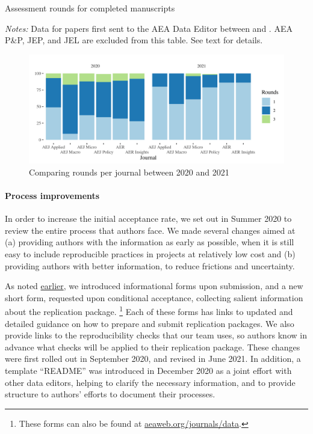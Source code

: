\documentclass[PP]{AEA}
\begin{document}
\begin{table}
    \centering
    \caption{Assessment rounds for completed manuscripts}
    \label{tab:pre:rounds}
    \begin{threeparttable}
    \centering
    
    \begin{tablenotes}
    \item[] \textit{Notes:} Data for papers first sent to the AEA Data Editor between \firstday{} and \lastday{}. AEA P\&P, JEP, and JEL are excluded from this table. See text for details.
    \end{tablenotes}
 \end{threeparttable}
\end{table}

\begin{figure}
    \includegraphics[width=\textwidth]{images/plot_rounds_compare.png}
    \centering
    \caption{Comparing rounds per journal between 2020 and 2021\label{fig:rounds}}
\end{figure}

\paragraph{Process improvements}

In order to increase the initial acceptance rate, we set out in Summer 2020 to review the entire process that authors face. We made several changes aimed at (a) providing authors with the information as early as possible, when it is still easy to include reproducible practices in projects at relatively low cost and (b) providing authors with better information, to reduce frictions and uncertainty. 

As noted  \hyperref[sec:dcap]{earlier}, we introduced informational forms upon submission, and a new short form, requested upon conditional acceptance, collecting salient information about the replication package.%
\footnote{These forms can also be found at \href{https://www.aeaweb.org/journals/data}{aeaweb.org/journals/data}.} 
Each of these forms has   links to updated and detailed guidance on how to prepare and submit replication packages. We also provide links to the reproducibility checks that our team uses, so authors know in advance what checks will be applied to their replication package. These changes were first rolled out in September 2020, and revised in June 2021. In addition, a template ``README'' \citep{READMEv1.0.0} was introduced in December 2020 as a joint effort with other data editors, helping to clarify the necessary information, and to provide structure to authors' efforts to document their processes.
\end{document}

